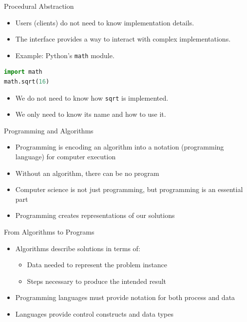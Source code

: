 \begin{frame}[fragile]{Procedural Abstraction}
    \begin{itemize}
        \item Users (clients) do not need to know implementation details.
        \item The interface provides a way to interact with complex implementations.
        \item Example: Python's \texttt{math} module.
    \end{itemize}

    \vspace{0.5cm} %

    
    \begin{lstlisting}[language=Python]
import math
math.sqrt(16)
    \end{lstlisting}

    \vspace{0.5cm} %

    \begin{itemize}
        \item We do not need to know how \texttt{sqrt} is implemented.
        \item We only need to know its name and how to use it.
    \end{itemize}
\end{frame}

\begin{frame}{Programming and Algorithms}
    \begin{itemize}
        \item Programming is encoding an algorithm into a notation (programming language) for computer execution
        \item Without an algorithm, there can be no program
        \item Computer science is not just programming, but programming is an essential part
        \item Programming creates representations of our solutions
    \end{itemize}
\end{frame}

\begin{frame}{From Algorithms to Programs}
    \begin{itemize}
        \item Algorithms describe solutions in terms of:
        \begin{itemize}
            \item Data needed to represent the problem instance
            \item Steps necessary to produce the intended result
        \end{itemize}
        \item Programming languages must provide notation for both process and data
        \item Languages provide control constructs and data types
    \end{itemize}
\end{frame}

